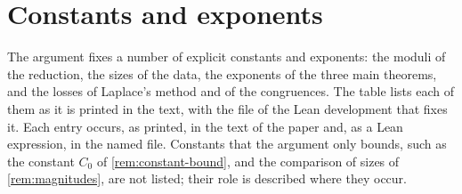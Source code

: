\section{Constants and exponents}\label{app:constants}
The argument fixes a number of explicit constants and exponents: the moduli of the reduction, the sizes of the data, the exponents of the three main theorems, and the losses of Laplace's method and of the
congruences. The table lists each of them as it is printed in the text, with the file of the Lean development that fixes it. Each entry occurs, as printed, in the text of the paper and, as a Lean expression,
in the named file. Constants that the argument only bounds, such as the constant $C_0$ of \cref{rem:constant-bound}, and the comparison of sizes of
\cref{rem:magnitudes}, are not listed; their role is described where they occur.


